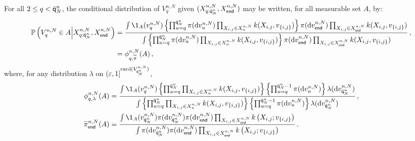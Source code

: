 


For all $2\le q < \bar{\mathsf{q}}^{n}_{N}$, the conditional distribution of $V_{q}^{n,N}$ given $(X_{q:\bar{\mathsf{q}}^{n}_{N}}^{n,N},X_{\mathsf{end}}^{n,N})$ may be written, for all measurable set $A$, by:
\begin{align*}
\bP\left(V_{q}^{n,N}\in A \middle | X_{q:\ordermax{n}{N}}^{n,N},X_{\mathsf{end}}^{n,N}\right) &= \frac{\int \1_{A}(v_{q}^{n,N})\left\{\prod_{u=q}^{\ordermax{n}{N}}\pi(\rmd v^{n,N}_{u})\prod_{X_{i,j}\in X^{n,N}_{u}}\condlik(X_{i,j},v_{\{i,j\}})\right\}\pi(\rmd v^{n,N}_{\mathsf{end}})\prod_{X_{i,j}\in X^{n,N}_{\mathsf{end}}}\condlik(X_{i,j},v_{\{i,j\}})}{\int \left\{\prod_{u=q}^{\ordermax{n}{N}}\pi(\rmd v^{n,N}_{u})\prod_{X_{i,j}\in X^{n,N}_{u}}\condlik(X_{i,j},v_{\{i,j\}})\right\}\pi(\rmd v^{n,N}_{\mathsf{end}})\prod_{X_{i,j}\in X^{n,N}_{\mathsf{end}}}\condlik(X_{i,j},v_{\{i,j\}})}\eqsp,\\
 &= \phi^{n,N}_{q,\widetilde{\pi}}(A)\eqsp,
\end{align*}
where, for any distribution $\lambda$ on $(\varepsilon,1]^{\mathrm{card}(V_{\bar{\mathsf{q}}^{n}_{N}}^{n,N})}$,  
\begin{align}
\phi^{n,N}_{q,\lambda}(A) &= \frac{\int \1_{A}(v_{q}^{n,N})\left\{\prod_{u=q}^{\ordermax{n}{N}}\prod_{X_{i,j}\in X^{n,N}_{u}}\condlik(X_{i,j},v_{\{i,j\}})\right\}\left\{\prod_{u=q}^{\ordermax{n}{N}-1}\pi(\rmd v^{n,N}_{u})\right\}\lambda(\rmd v^{n,N}_{\ordermax{n}{N}})}{\int \left\{\prod_{u=q}^{\ordermax{n}{N}}\prod_{X_{i,j}\in X^{n,N}_{u}}\condlik(X_{i,j},v_{\{i,j\}})\right\}\left\{\prod_{u=q}^{\ordermax{n}{N}-1}\pi(\rmd v^{n,N}_{u})\right\}\lambda(\rmd v^{n,N}_{\ordermax{n}{N}})}\eqsp,\label{eq:filt}\\
 \widetilde{\pi}_{\mathsf{end}}^{n,N}(A) &= \frac{\int \1_A(v_{\ordermax{n}{N}}^{n,N}) \pi(\rmd v_{\ordermax{n}{N}}^{n,N})\pi(\rmd v_{\mathsf{end}}^{n,N})\prod_{X_{i,j}\in X^{n,N}_{\mathsf{end}}}\condlik\left(X_{i,j};v_{\{i,j\}}\right)}{\int \pi(\rmd v_{\ordermax{n}{N}}^{n,N})\pi(\rmd v_{\mathsf{end}}^{n,N})\prod_{X_{i,j}\in X^{n,N}_{\mathsf{end}}}\condlik\left(X_{i,j};v_{\{i,j\}}\right)}\eqsp.\label{eq:lastdist}
\end{align}
